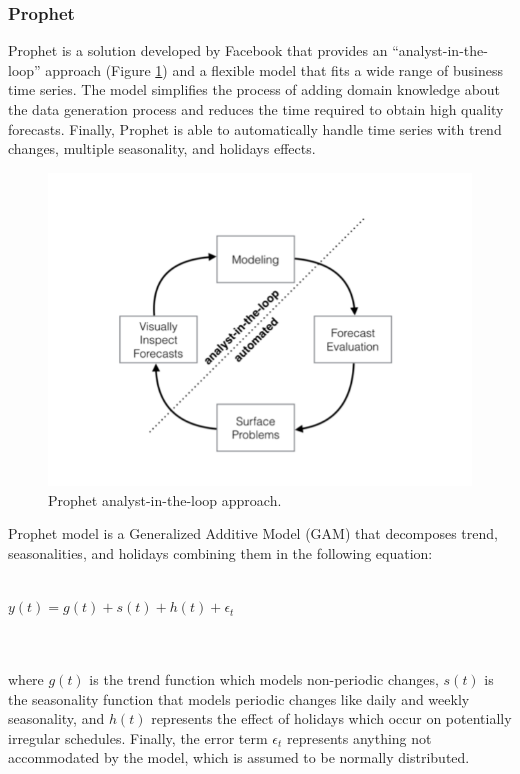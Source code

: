 \documentclass[a4paper, 12pt]{article} %
\begin{document}
	\subsubsection{Prophet } \label{sssec:prohet}
	Prophet \cite{FacebookProphet} is a solution developed by Facebook that provides an ``analyst-in-the-loop'' approach (Figure \ref{fig:analyst_in_the_loop}) and a flexible model that fits a wide range of business time series. The model simplifies the process of adding domain knowledge about the data generation process and reduces the time required to obtain high quality forecasts. Finally, Prophet is able to automatically handle time series with trend changes, multiple seasonality, and holidays effects.
	\begin{figure}
		\includegraphics[width=\linewidth]{img/sota_ts_fb_prophet.png}
		\caption{Prophet analyst-in-the-loop approach.}
		\label{fig:analyst_in_the_loop}
	\end{figure}
	Prophet model is a Generalized Additive Model (GAM) \cite{GAM} that decomposes trend, seasonalities, and holidays combining them in the following equation:\\\\
	\centerline{$y(t) = g(t) + s(t) + h(t) + \epsilon_t$}\\\\
	where $g(t)$ is the trend function which models non-periodic changes, $s(t)$ is the seasonality function that models periodic changes like daily and weekly seasonality, and $h(t)$ represents the effect of holidays which occur on potentially irregular schedules. Finally, the error term $\epsilon_t$ represents anything not accommodated by the model, which is assumed to be normally distributed. \\
\end{document}
